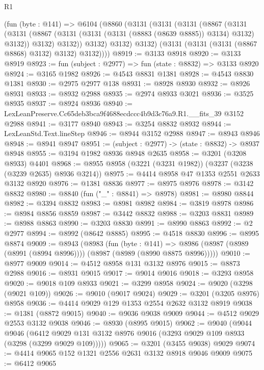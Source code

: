 \begin{lexlean}{R1}
\begin{coremodule}
      (fun (byte : @141) =>
      @6104
        (@8860
          (@3131
            (@3131
              (@3131
                (@8867
                  (@3131
                    (@3131
                      (@8867 (@3131 (@3131 (@3131 (@8883 (@8639 @8885)) @3134) @3132) @3132))
                      @3132)
                    @3132))
                @3132)
              @3132)
            @3132)
          (@3131 (@3131 (@3131 (@8867 @8868) @3132) @3132) @3132))))
@8919 := @3133 @8918
@8920 := @3133 @8919
@8923 := fun (subject : @2977) => fun (state : @8832) => @3133 @8920
@8924 := @3165 @1982
@8926 := @4543 @8831 @1381
@8928 := @4543 @8830 @1381
@8930 := @2975 @2977 @138
@8931 := @8928 @8930
@8932 := @8926 @8931
@8933 := @8932 @2988
@8935 := @2974 @8933 @3021
@8936 := @3525 @8935
@8937 := @8924 @8936
@8940 := LexLeanPreserve.Cc65deb3bca9f4688ecdccc4b9d3c76a9.R1.__fits_39 @3152 @2988
@8941 := @3177 @8940
@8943 := @3254 @8832 @8932
@8944 := LexLeanStd.Text.lineStep
@8946 := @8944 @3152 @2988
@8947 := @8943 @8946
@8948 := @8941 @8947
@8951 := (subject : @2977) -> (state : @8832) -> @8937 @8948
@8955 := @3194 @1982 @8936 @8948 @2635
@8958 := @3201 (@3208 @8933) @4401
@8968 := @8955 @8958 (@3221 (@3231 @1982)) (@3237 (@3238 (@3239 @2635) @8936 @3214))
@8975 := @4414 @8958 @47 @1353 @2551 @2633 @3132 @8920
@8976 := @1381 @8836
@8977 := @8975 @8976
@8978 := @3142 @8832
@8980 := @8840 (fun ("_" : @8841) => @8978)
@8981 := @8980 @8844
@8982 := @3394 @8832
@8983 := @8981 @8982
@8984 := @3819 @8978
@8986 := @8984 @8856 @8859
@8987 := @3442 @8832
@8988 := @3203 @8831
@8989 := @8988 @8863
@8990 := @3203 @8830
@8991 := @8990 @8863
@8992 := @2 @2977
@8994 := @8992 (@8642 @8885)
@8995 := @4518 @8830
@8996 := @8995 @8874
@9009 := @8943
    (@8983
      (fun (byte : @141) =>
      @8986 (@8987 (@8989 (@8991 (@8994 @8996)))) (@8987 (@8989 (@8990 @8875 @8996)))))
@9010 := @8977 @9009
@9014 := @4512 @8958 @131 @3132 @8976
@9015 := @8873 @2988
@9016 := @8931 @9015
@9017 := @9014 @9016
@9018 := @3293 @8958
@9020 := @9018 @109 @8933
@9021 := @3299 @8958
@9024 := @9020 (@3298 (@9021 @109))
@9026 := @9010 (@9017 @9024)
@9029 := @3201 (@3205 @8976) @8958
@9036 := @4414 @9029 @129 @1353 @2554 @2632 @3132 @8919
@9038 := @1381 (@8872 @9015)
@9040 := @9036 @9038 @9009
@9044 := @4512 @9029 @2553 @3132 @9038
@9046 := @8930 (@8995 @9015)
@9062 := @9040
    (@9044
      @9046
      (@6412 @9029 @131 @3132 @8976 @9016 (@3293 @9029 @109 @8933 (@3298 (@3299 @9029 @109)))))
@9065 := @3201 (@3455 @9038) @9029
@9074 := @4414 @9065 @152 @1321 @2556 @2631 @3132 @8918 @9046 @9009
@9075 := @6412 @9065

\end{coremodule}
\end{lexlean}
